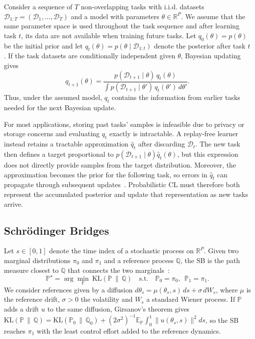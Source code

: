 \documentclass{article}
\begin{document}
Consider a sequence of $T$ non-overlapping tasks with i.i.d. datasets $\mathcal{D}_{1:T}=(\mathcal{D}_1,\ldots,\mathcal{D}_T)$ and a model with parameters $\theta\in\mathbb{R}^P$. We assume that the same parameter space is used throughout the task sequence and after learning task $t$, its data are not available when training future tasks. Let $q_0(\theta)=p(\theta)$ be the initial prior and let $q_t(\theta) = p(\theta\mid\mathcal{D}_{1:t})$ denote the posterior after task $t$. If the task datasets are conditionally independent given $\theta$, Bayesian updating gives
\begin{equation}
    q_{t+1}(\theta)
    = \frac{p(\mathcal{D}_{t+1}\mid\theta)\,q_t(\theta)}
           {\int p(\mathcal{D}_{t+1}\mid\theta')\,q_t(\theta')\,d\theta'}.
    \label{eq:sequential_bayes}
\end{equation}
Thus, under the assumed model, $q_t$ contains the information from earlier tasks needed for the next Bayesian update.

For most applications, storing past tasks' samples is infeasible due to privacy or storage concerns and evaluating $q_t$ exactly is intractable. A replay-free learner instead retains a tractable approximation $\hat q_t$ after discarding $\mathcal{D}_t$. The new task then defines a target proportional to $p(\mathcal{D}_{t+1}\mid\theta)\hat q_t(\theta)$, but this expression does not directly provide samples from the target distribution. Moreover, the
approximation becomes the prior for the following task, so errors in $\hat q_t$ can propagate through subsequent updates~\cite{kessler2023sequential}. Probabilistic CL must therefore both represent the accumulated posterior and update that representation as new tasks arrive.

\subsection{Schr\"odinger Bridges}

Let $s\in[0,1]$ denote the time index of a stochastic process on $\mathbb{R}^P$. Given two marginal distributions
$\pi_0$ and $\pi_1$ and a reference process $\mathbb{Q}$, the SB is the path measure closest to $\mathbb{Q}$ that connects the two
marginals~\cite{leonard2014survey}:
\begin{equation}
    \mathbb{P}^\star = \arg\min_{\mathbb{P}}\ \mathrm{KL}(\mathbb{P}\,\|\,\mathbb{Q})
    \quad \text{s.t.} \quad \mathbb{P}_0=\pi_0,\ \ \mathbb{P}_1=\pi_1 .
    \label{eq:sb}
\end{equation}
We consider references given by a diffusion
$d\theta_s = \mu(\theta_s,s)\,ds + \sigma\,dW_s$, where $\mu$ is the reference
drift, $\sigma>0$ the volatility and $W_s$ a standard Wiener process. If
$\mathbb{P}$ adds a drift $u$ to the same diffusion, Girsanov's theorem gives
$\mathrm{KL}(\mathbb{P}\,\|\,\mathbb{Q})=\mathrm{KL}(\mathbb{P}_0\,\|\,\mathbb{Q}_0)
+(2\sigma^2)^{-1}\mathbb{E}_{\mathbb{P}}\int_0^1\|u(\theta_s,s)\|^2ds$, so the
SB reaches $\pi_1$ with the least control effort added to the reference
dynamics. 
\end{document}

